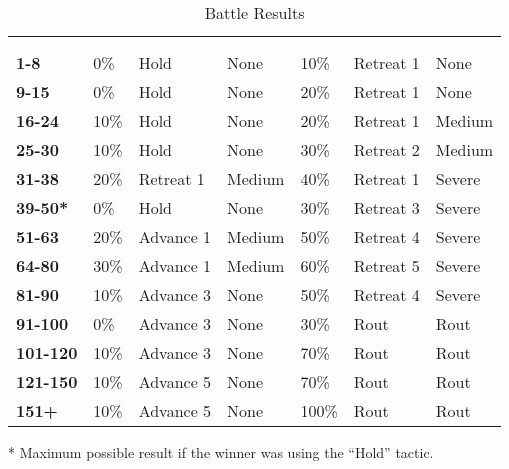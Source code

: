\begin {table}[H]
  \caption{Battle Results}\label{tab:Battle Results}
  \begin{tabularx}{\columnwidth}{>{\bfseries}YYYYYYY}
	\thead{} &  & \\
	 &  &  &  &  &  & \\
	1-8 & 0\% & Hold & None & 10\% & Retreat 1 & None\\
	9-15 & 0\% & Hold & None & 20\% & Retreat 1 & None\\
	16-24 & 10\% & Hold & None & 20\% & Retreat 1 & Medium\\
	25-30 & 10\% & Hold & None & 30\% & Retreat 2 & Medium\\
	31-38 & 20\% & Retreat 1 & Medium & 40\% & Retreat 1 & Severe\\
	39-50* & 0\% & Hold & None & 30\% & Retreat 3 & Severe\\
	51-63 & 20\% & Advance 1 & Medium & 50\% & Retreat 4 & Severe\\
	64-80 & 30\% & Advance 1 & Medium & 60\% & Retreat 5 & Severe\\
	81-90 & 10\% & Advance 3 & None & 50\% & Retreat 4 & Severe\\
	91-100 & 0\% & Advance 3 & None & 30\% & Rout & Rout\\
	101-120 & 10\% & Advance 3 & None & 70\% & Rout & Rout\\
	121-150 & 10\% & Advance 5 & None & 70\% & Rout & Rout\\
	151+ & 10\% & Advance 5 & None & 100\% & Rout & Rout
  \end {tabularx}
	* Maximum possible result if the winner was using the “Hold” tactic.
\end {table}
